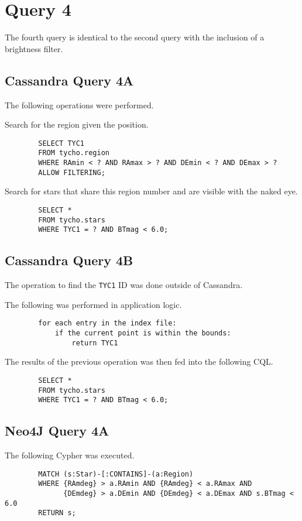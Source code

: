 \documentclass[11pt]{article}
\begin{document}
    \section{Query 4}\label{sec:query4}
    The fourth query is identical to the second query with the inclusion of a brightness filter.

    \subsection{Cassandra Query 4A}\label{subsec:cassandraQuery4a}
    The following operations were performed.

    Search for the region given the position.
    \begin{lstlisting}
        SELECT TYC1
        FROM tycho.region
        WHERE RAmin < ? AND RAmax > ? AND DEmin < ? AND DEmax > ?
        ALLOW FILTERING;
    \end{lstlisting}

    Search for stars that share this region number and are visible with the naked eye.
    \begin{lstlisting}
        SELECT *
        FROM tycho.stars
        WHERE TYC1 = ? AND BTmag < 6.0;
    \end{lstlisting}

    \subsection{Cassandra Query 4B}\label{subsec:cassandraQuery4b}
    The operation to find the \texttt{TYC1} ID was done outside of Cassandra.

    The following was performed in application logic.
    \begin{lstlisting}
        for each entry in the index file:
            if the current point is within the bounds:
                return TYC1
    \end{lstlisting}

    The results of the previous operation was then fed into the following CQL\@.
    \begin{lstlisting}
        SELECT *
        FROM tycho.stars
        WHERE TYC1 = ? AND BTmag < 6.0;
    \end{lstlisting}

    \subsection{Neo4J Query 4A}\label{subsec:neo4jQuery4a}
    The following Cypher was executed.
    \begin{lstlisting}
        MATCH (s:Star)-[:CONTAINS]-(a:Region)
        WHERE {RAmdeg} > a.RAmin AND {RAmdeg} < a.RAmax AND
              {DEmdeg} > a.DEmin AND {DEmdeg} < a.DEmax AND s.BTmag < 6.0
        RETURN s;
    \end{lstlisting}
\end{document}
